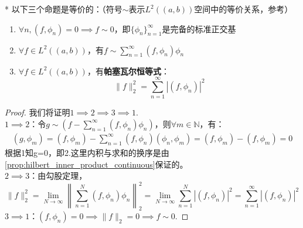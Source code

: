 \begin{theorem}*
以下三个命题是等价的：（符号$\sim$表示$L^2((a,b))$空间中的等价关系，参考）
\begin{enumerate}
    \item $\forall n,(f,\phi_n)=0\implies f\sim 0$，即$\{\phi_n\}_{n=1}^{\infty}$是完备的标准正交基
    \item $\forall f\in L^2((a,b))$，有$f\sim\sum_{n=1}^{\infty}(f,\phi_n)\phi_n$
    \item $\forall f\in L^2((a,b))$，有\textbf{帕塞瓦尔恒等式}：
          \[\|f\|_2^2=\sum_{n=1}^{\infty}|(f,\phi_n)|^2\]
\end{enumerate}
\end{theorem}
\begin{proof}
我们将证明$1\implies 2\implies 3\implies 1$.\\
$1\implies 2$：令$g\sim \left(f-\sum_{n=1}^{\infty}(f,\phi_n)\phi_n\right)$，则$\forall m\in\mathbb{N}$，有：\begin{align*}
    \left(g,\phi_m\right)=\left(f,\phi_m\right)-\sum_{n=1}^{\infty}\left(f,\phi_n\right)\left(\phi_n,\phi_m\right)=\left(f,\phi_m\right)-\left(f,\phi_m\right)=0 
\end{align*}
根据1知g=0，即2.这里内积与求和的换序是由\cref{prop:hilbert_inner_product_continuous}保证的。\\
$2\implies 3$：由勾股定理，
\[\|f\|_2^2=\lim_{N\to\infty}\left\|\sum_{n=1}^{N}(f,\phi_n)\phi_n\right\|_2^2=\lim_{N\to\infty}\sum_{n=1}^{N}|(f,\phi_n)|^2=\sum_{n=1}^{\infty}|(f,\phi_n)|^2\]
$3\implies 1$：$(f,\phi_n)=0\implies\|f\|_2=0\implies f\sim 0$.
\end{proof}
